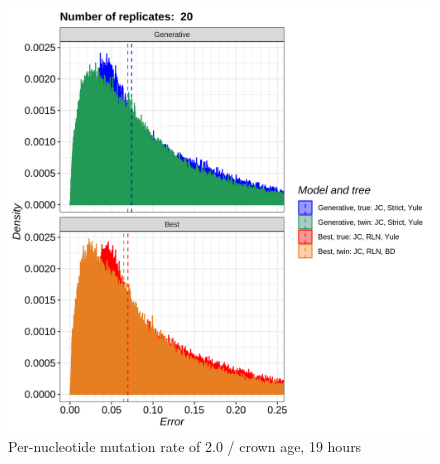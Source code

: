 \begin{figure}[H]
  \includegraphics[width=\textwidth]{pirouette_example_40/errors.png}
  \caption{Per-nucleotide mutation rate of 2.0 / crown age, 19 hours}
\end{figure}

